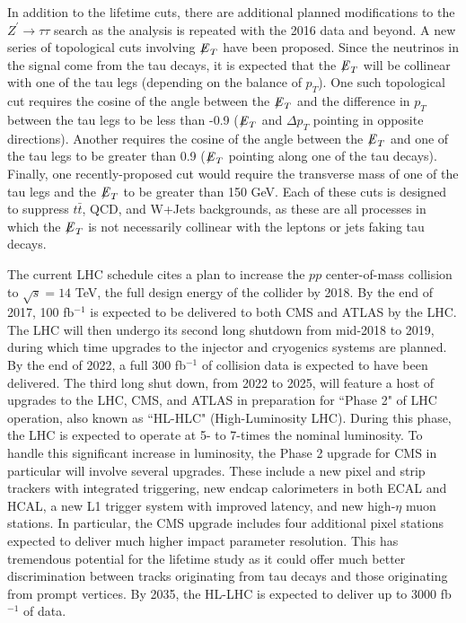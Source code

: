 In addition to the lifetime cuts, there are additional planned modifications to the $Z^\prime\to\tau\tau$ search as the analysis is repeated with the 2016 data and beyond. A new series of topological cuts involving ${\not\mathrel{E}}_T$ have been proposed. Since the neutrinos in the signal come from the tau decays, it is expected that the ${\not\mathrel{E}}_T$ will be collinear with one of the tau legs (depending on the balance of $p_T$). One such topological cut requires the cosine of the angle between the ${\not\mathrel{E}}_T$ and the difference in $p_T$ between the tau legs to be less than -0.9 (${\not\mathrel{E}}_T$ and $\Delta p_T$ pointing in opposite directions). Another requires the cosine of the angle between the ${\not\mathrel{E}}_T$ and one of the tau legs to be greater than 0.9 (${\not\mathrel{E}}_T$ pointing along one of the tau decays). Finally, one recently-proposed cut would require the transverse mass of one of the tau legs and the ${\not\mathrel{E}}_T$ to be greater than 150 GeV. Each of these cuts is designed to suppress $t\bar{t}$, QCD, and W+Jets backgrounds, as these are all processes in which the ${\not\mathrel{E}}_T$ is not necessarily collinear with the leptons or jets faking tau decays.

The current LHC schedule cites a plan to increase the $pp$ center-of-mass collision to $\sqrt{s} = 14$ TeV, the full design energy of the collider by 2018. By the end of 2017, 100 fb$^{-1}$ is expected to be delivered to both CMS and ATLAS by the LHC. The LHC will then undergo its second long shutdown from mid-2018 to 2019, during which time upgrades to the injector and cryogenics systems are planned. By the end of 2022, a full 300 fb$^{-1}$ of collision data is expected to have been delivered. The third long shut down, from 2022 to 2025, will feature a host of upgrades to the LHC, CMS, and ATLAS in preparation for ``Phase 2" of LHC operation, also known as ``HL-HLC" (High-Luminosity LHC).\cite{LHCSchedule} During this phase, the LHC is expected to operate at 5- to 7-times the nominal luminosity. To handle this significant increase in luminosity, the Phase 2 upgrade for CMS in particular will involve several upgrades. These include a new pixel and strip trackers with integrated triggering, new endcap calorimeters in both ECAL and HCAL, a new L1 trigger system with improved latency, and new high-$\eta$ muon stations.\cite{CMSUpgrade} In particular, the CMS upgrade includes four additional pixel stations expected to deliver much higher impact parameter resolution. This has tremendous potential for the lifetime study as it could offer much better discrimination between tracks originating from tau decays and those originating from prompt vertices. By 2035, the HL-LHC is expected to deliver up to 3000 fb$^{-1}$ of data.\cite{LHCSchedule} 


